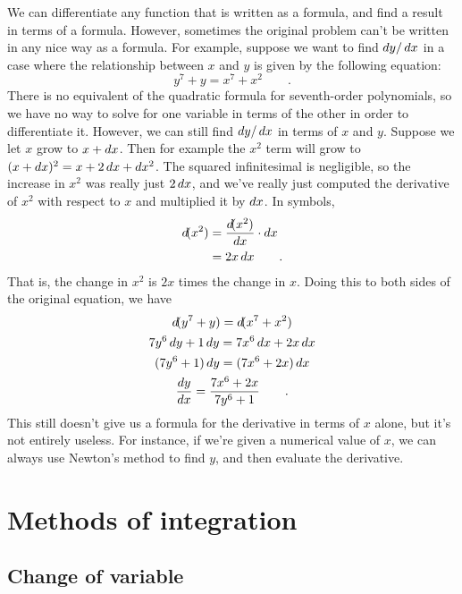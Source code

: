 We can differentiate any function that is written as a formula,
and find a result in terms of a formula. However, sometimes the
original problem can't be written in any nice way as a formula.
For example, suppose we want to find $\mathop{d\!} y/\mathop{d\!} x$ in a case
where the relationship between $x$
and $y$ is given by the following equation:
\begin{equation*}
  y^7+y = x^7+x^2 \qquad .
\end{equation*}
There is no equivalent of the quadratic formula for seventh-order
polynomials, so we have no way to solve for one variable in terms
of the other in order to differentiate it. However, we can still
find $\mathop{d\!} y/\mathop{d\!} x$ in terms of $x$ and $y$. Suppose we let $x$
grow to $x+\mathop{d\!} x$. Then for example the $x^2$ term will grow
to $(x+\mathop{d\!} x)^2=x+2\mathop{d\!} x+\mathop{d\!} x^2$. The squared infinitesimal
is negligible, so the increase in $x^2$ was really just
$2\mathop{d\!} x$, and we've really just computed the derivative of
$x^2$ with respect to $x$ and multiplied it by $\mathop{d\!} x$. In
symbols,
\begin{align*}
  \mathop{d\!}(x^2) &= \frac{\mathop{d\!}(x^2)}{\mathop{d\!} x} \cdot \mathop{d\!} x \\
           &= 2x \mathop{d\!} x \qquad .
\end{align*}
That is, the change in $x^2$ is $2x$ times the change in $x$.
Doing this to both sides of the original equation, we have
\begin{gather*}
  \der(y^7+y) = \der(x^7+x^2)\\
  7y^6\der y + 1\der y = 7x^6\der x + 2x\der x\\
  (7y^6+1)\der y = (7x^6+2x)\der x \\
  \frac{\der y}{\der x} = \frac{7x^6+2x}{7y^6+1} \qquad .
\end{gather*}
This still doesn't give us a formula for the derivative in
terms of $x$ alone, but it's not entirely useless. For instance,
if we're given a numerical value of $x$, we can always use
Newton's method to find $y$, and then
evaluate the derivative.

\section{Methods of integration}

\subsection{Change of variable}\label{change-of-variable-for-integration}


